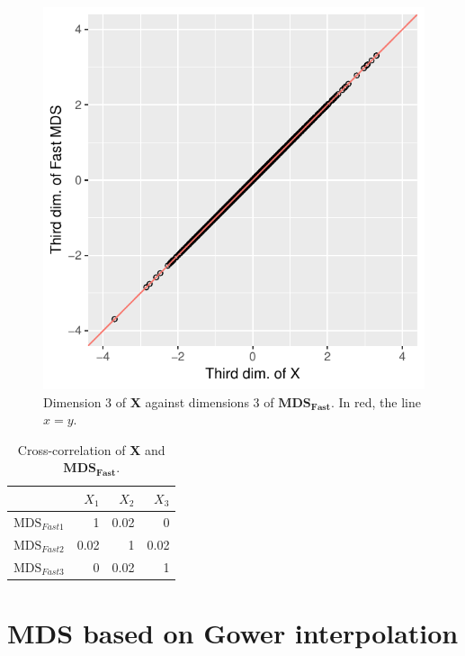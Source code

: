 \documentclass[11pt]{report}
\begin{document}
\FloatBarrier

\begin{figure}
    \centering
    \includegraphics[scale = 1]{./images/third_fast.pdf}
    \caption{Dimension 3 of \textbf{X} against dimensions 3 of  $\mathbf{MDS_{Fast}}$. In red, the line $x=y$.}
    \label{fast_example3}
\end{figure}


\FloatBarrier


\begin{table}[ht]
\centering
\begin{tabular}{r|rrr}
 & $X_1$ & $X_2$ & $X_3$ \\ 
  \hline
  $\mbox{MDS}_{Fast1}$ & 1 & 0.02 & 0 \\ 
  $\mbox{MDS}_{Fast2}$ & 0.02 & 1 & 0.02 \\ 
  $\mbox{MDS}_{Fast3}$ & 0 & 0.02 & 1 \\ 
   \hline
\end{tabular}
\caption{Cross-correlation of \textbf{X} and $\mathbf{MDS_{Fast}}$.} 
\label{corr_fast}
\end{table}

\section{MDS based on Gower interpolation}
\end{document}
